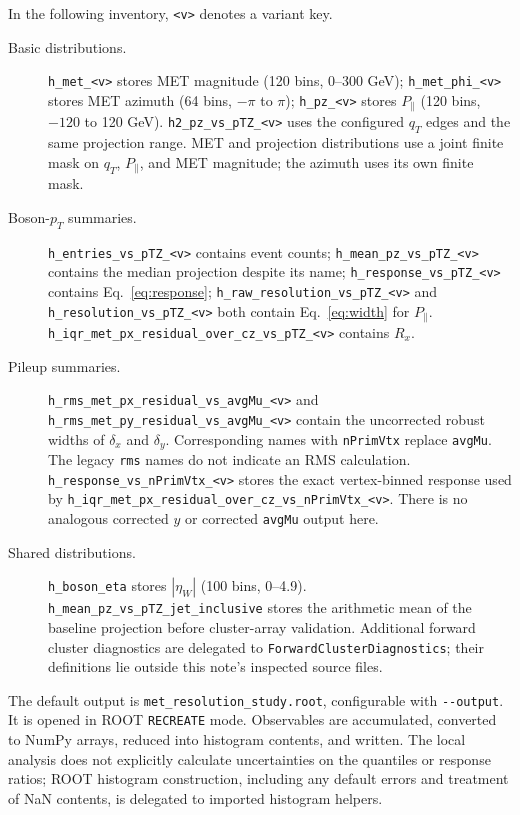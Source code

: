\documentclass[11pt,a4paper]{article}
\newcommand{\code}[1]{\texttt{\nolinkurl{#1}}}
\begin{document}
In the following inventory, \code{<v>} denotes a variant key.
\begin{description}
\item[Basic distributions.]
\code{h_met_<v>} stores MET magnitude (120 bins, 0--300 GeV);
\code{h_met_phi_<v>} stores MET azimuth (64 bins, $-\pi$ to $\pi$);
\code{h_pz_<v>} stores $P_\parallel$ (120 bins, $-120$ to 120 GeV).
\code{h2_pz_vs_pTZ_<v>} uses the configured $q_T$ edges and the same
projection range. MET and projection distributions use a joint finite mask
on $q_T$, $P_\parallel$, and MET magnitude; the azimuth uses its own finite mask.
\item[Boson-$p_T$ summaries.]
\code{h_entries_vs_pTZ_<v>} contains event counts;
\code{h_mean_pz_vs_pTZ_<v>} contains the median projection despite its name;
\code{h_response_vs_pTZ_<v>} contains Eq.~\eqref{eq:response};
\code{h_raw_resolution_vs_pTZ_<v>} and
\code{h_resolution_vs_pTZ_<v>} both contain Eq.~\eqref{eq:width} for
$P_\parallel$.
\code{h_iqr_met_px_residual_over_cz_vs_pTZ_<v>} contains $R_x$.
\item[Pileup summaries.]
\code{h_rms_met_px_residual_vs_avgMu_<v>} and
\code{h_rms_met_py_residual_vs_avgMu_<v>} contain the uncorrected
robust widths of $\delta_x$ and $\delta_y$. Corresponding names with
\code{nPrimVtx} replace \code{avgMu}. The legacy \code{rms} names do not
indicate an RMS calculation.
\code{h_response_vs_nPrimVtx_<v>} stores the exact vertex-binned response
used by \code{h_iqr_met_px_residual_over_cz_vs_nPrimVtx_<v>}.
There is no analogous corrected $y$ or corrected \code{avgMu} output here.
\item[Shared distributions.]
\code{h_boson_eta} stores $|\eta_W|$ (100 bins, 0--4.9).
\code{h_mean_pz_vs_pTZ_jet_inclusive} stores the arithmetic mean of the
baseline projection before cluster-array validation. Additional forward
cluster diagnostics are delegated to \code{ForwardClusterDiagnostics};
their definitions lie outside this note's inspected source files.
\end{description}

The default output is \code{met_resolution_study.root}, configurable with
\code{--output}. It is opened in ROOT \code{RECREATE} mode. Observables are
accumulated, converted to NumPy arrays, reduced into histogram contents,
and written. The local analysis does not explicitly calculate uncertainties
on the quantiles or response ratios; ROOT histogram construction, including
any default errors and treatment of NaN contents, is delegated to imported
histogram helpers.
\end{document}
